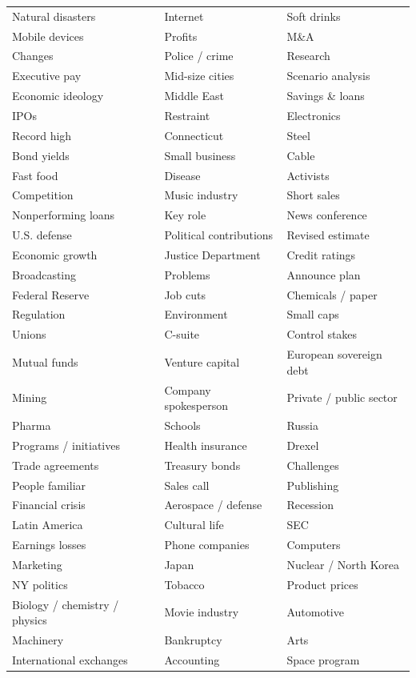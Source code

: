 \documentclass[11pt]{article}
\begin{document}
\begin{longtable}{>{\raggedright\arraybackslash}p{}
                  >{\raggedright\arraybackslash}p{}
                  >{\raggedright\arraybackslash}p{}}
Natural disasters & Internet & Soft drinks \\
Mobile devices & Profits & M\&A \\
Changes & Police / crime & Research \\
Executive pay & Mid-size cities & Scenario analysis \\
Economic ideology & Middle East & Savings \& loans \\
IPOs & Restraint & Electronics \\
Record high & Connecticut & Steel \\
Bond yields & Small business & Cable \\
Fast food & Disease & Activists \\
Competition & Music industry & Short sales \\
Nonperforming loans & Key role & News conference \\
U.S. defense & Political contributions & Revised estimate \\
Economic growth & Justice Department & Credit ratings \\
Broadcasting & Problems & Announce plan \\
Federal Reserve & Job cuts & Chemicals / paper \\
Regulation & Environment & Small caps \\
Unions & C-suite & Control stakes \\
Mutual funds & Venture capital & European sovereign debt \\
Mining & Company spokesperson & Private / public sector \\
Pharma & Schools & Russia \\
Programs / initiatives & Health insurance & Drexel \\
Trade agreements & Treasury bonds & Challenges \\
People familiar & Sales call & Publishing \\
Financial crisis & Aerospace / defense & Recession \\
Latin America & Cultural life & SEC \\
Earnings losses & Phone companies & Computers \\
Marketing & Japan & Nuclear / North Korea \\
NY politics & Tobacco & Product prices \\
Biology / chemistry / physics & Movie industry & Automotive \\
Machinery & Bankruptcy & Arts \\
International exchanges & Accounting & Space program \\

\end{longtable}
\end{document}
